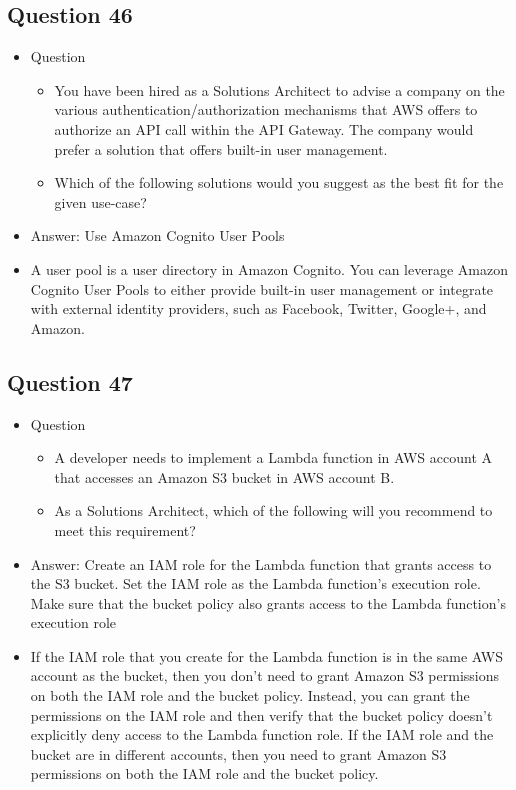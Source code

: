 \documentclass[]{scrartcl}
\begin{document}
\subsection{Question 46}
\begin{itemize}
	\item Question
	\begin{itemize}
		\item You have been hired as a Solutions Architect to advise a company on the various authentication/authorization mechanisms that AWS offers to authorize an API call within the API Gateway. The company would prefer a solution that offers built-in user management.
		\item Which of the following solutions would you suggest as the best fit for the given use-case?
	\end{itemize}
	\item Answer: Use Amazon Cognito User Pools
	\item A user pool is a user directory in Amazon Cognito. You can leverage Amazon Cognito User Pools to either provide built-in user management or integrate with external identity providers, such as Facebook, Twitter, Google+, and Amazon. 
\end{itemize}

\subsection{Question 47}
\begin{itemize}
	\item Question
	\begin{itemize}
		\item A developer needs to implement a Lambda function in AWS account A that accesses an Amazon S3 bucket in AWS account B.
		\item As a Solutions Architect, which of the following will you recommend to meet this requirement?
	\end{itemize}
	\item Answer: Create an IAM role for the Lambda function that grants access to the S3 bucket. Set the IAM role as the Lambda function's execution role. Make sure that the bucket policy also grants access to the Lambda function's execution role
	\item If the IAM role that you create for the Lambda function is in the same AWS account as the bucket, then you don't need to grant Amazon S3 permissions on both the IAM role and the bucket policy. Instead, you can grant the permissions on the IAM role and then verify that the bucket policy doesn't explicitly deny access to the Lambda function role. If the IAM role and the bucket are in different accounts, then you need to grant Amazon S3 permissions on both the IAM role and the bucket policy.
\end{itemize}
\end{document}
